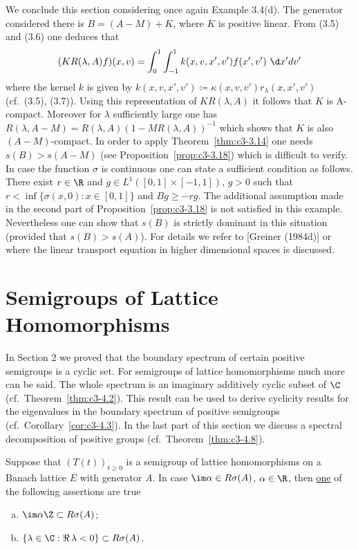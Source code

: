We conclude this section considering once again Example 3.4(d).
The generator considered there is $B = (A - M) + K$, where $K$ is
%
positive linear. 
From (3.5) and (3.6) one deduces that 
\[
(KR(\lambda,A)f)(x,v) = \int_{0}^{1}\int_{-1}^{1} k(x,v,x',v')f(x',v')~\d x'dv'
\]
where the kernel $k$ is given by $k(x,v,x',v') \coloneqq  \kappa(x,v,v')r_{\lambda}(x,x',v')$ (cf.\ (3.5), (3.7)). 
Using this representation of $KR(\lambda,A)$ it follows that $K$ is A-compact. 
Moreover for $\lambda$ sufficiently large one has $R(\lambda,A-M) = R(\lambda,A)(1 - MR(\lambda,A))^{-1}$ which shows that $K$ is also $(A-M)$-compact. 
In order to apply Theorem~\ref{thm:c3-3.14} one needs $s(B) > s(A-M)$ (see Proposition~\ref{prop:c3-3.18}) which is difficult to verify. 
In case the function $\sigma$ is continuous one can state a sufficient condition as follows.
There exist $r \in \R $ and $g \in L^{1}([0,1]\times[-1,1])$, $g > 0$ such that $r < \inf\{\sigma(x,0) : x \in [0,1]\}$ and $Bg \geq -rg$.
The additional assumption made in the second part of Proposition~\ref{prop:c3-3.18} is not satisfied in this example. 
Nevertheless one can show that $s(B)$ is strictly dominant in this situation (provided that $s(B) > s(A)$). 
For details we refer to [Greiner (1984d)] or \citet{voigt:1985} where the linear transport equation in higher dimensional spaces is discussed.

\section{Semigroups of Lattice Homomorphisms}\label{sec:c3-4}

In Section 2 we proved that the boundary spectrum of certain positive semigroups is a cyclic set. 
For semigroups of lattice homomorphisms much more can be said. The whole spectrum is an imaginary additively cyclic subset of $\C $ (cf.\ Theorem~\ref{thm:c3-4.2}). 
This result can be used to derive cyclicity results for the eigenvalues in the boundary spectrum of positive semigroups (cf.\ Corollary~\ref{cor:c3-4.3}). 
In the last part of this section we discuss a spectral decomposition of positive groups (cf.\ Theorem~\ref{thm:c3-4.8}).

\begin{lemma}\label{lem:c3-4.1}
	Suppose that $(T(t))_{t \ge 0}$ is a semigroup of lattice homomorphisms on a Banach lattice $E$ with generator $A$.
	In case $\im\alpha \in R\sigma(A)$, $\alpha \in \R $, then \underline{one} of the following assertions are true
	\begin{enumerate}[(a)]
		\item $\im\alpha\Z \subset R\sigma(A)$;
		\item $\{\lambda \in \C  : \Re\,\lambda < 0 \} \subset R\sigma(A)$.
	\end{enumerate}
\end{lemma}

